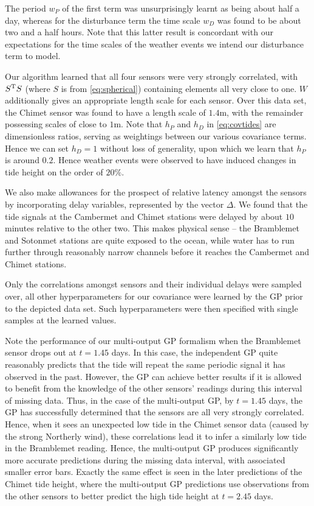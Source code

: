 \documentclass{acmtrans2m}
\newcommand{\dnt}[1]{_{{#1}}}
\begin{document}
The period $w_P$ of the first term was unsurprisingly learnt as being about half a day, whereas for the disturbance term the time scale $w\dnt{D}$ was found to be about two and a half hours. Note that this latter result is concordant with our expectations for the time scales of the weather events we intend our disturbance term to model. 

Our algorithm learned that all four sensors were very strongly correlated, with $S^{\mathrm{T}} S$ (where $S$ is from \eqref{eq:spherical})  containing elements all very close to one. $W$ additionally gives an appropriate length scale for each sensor. Over this data set, the Chimet sensor was found to have a length scale of $1.4$m, with the remainder possessing scales of close to $1$m. Note that $h\dnt{P}$ and $h\dnt{D}$ in \eqref{eq:covtides} are dimensionless ratios, serving as weightings between our various covariance terms. Hence we can set $h\dnt{D}=1$ without loss of generality, upon which we learn that $h\dnt{P}$ is around $0.2$. Hence weather events were observed to have induced changes in tide height on the order of $20\%$.

We also make allowances for the prospect of relative latency amongst the sensors by incorporating delay variables, represented by the vector $\Delta$. We found that the tide signals at the Cambermet and Chimet stations were delayed by about $10$ minutes relative to the other two. This makes physical sense -- the Bramblemet and Sotonmet stations are quite exposed to the ocean, while water has to run further through reasonably narrow channels before it reaches the Cambermet and Chimet stations.

Only the correlations amongst sensors and their individual delays were sampled over, all other hyperparameters for our covariance were learned by the GP prior to the depicted data set. Such hyperparameters were then specified with single samples at the learned values.

Note the performance of our multi-output GP formalism when the Bramblemet sensor drops out at $t=1.45$ days.
In this case, the independent GP quite reasonably predicts that the tide will repeat the same periodic signal it has observed in the past. However, the GP can achieve better results if it is allowed to benefit from the knowledge of the other sensors' readings during this interval of missing data. Thus, in the case of the multi-output GP, by $t=1.45$ days, the GP has successfully determined that the sensors are all very strongly correlated. Hence, when it sees an unexpected low tide in the Chimet sensor data (caused by the strong Northerly wind), these correlations lead it to infer a similarly low tide in the Bramblemet reading. Hence, the multi-output GP produces significantly more accurate predictions during the missing data interval, with associated smaller error bars. Exactly the same effect is seen in the later predictions of the Chimet tide height, where the multi-output GP predictions use observations from the other sensors to better predict the high tide height at $t=2.45$ days. 
\end{document}

